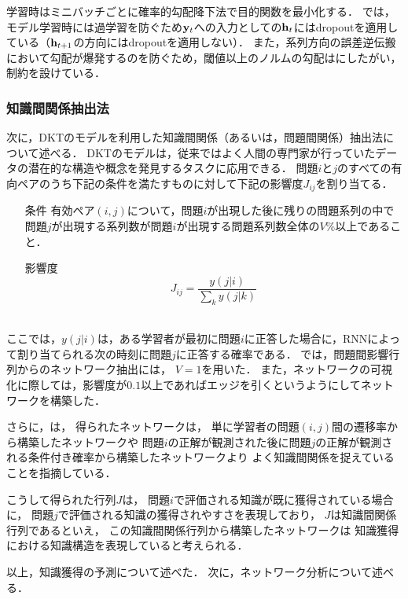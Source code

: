 学習時はミニバッチごとに確率的勾配降下法で目的関数を最小化する．
\cite{piech2015deep}では，モデル学習時には過学習を防ぐため${\bf y}_t$への入力としての${\bf h}_t$にはdropout\cite{srivastava2014dropout}を適用している（${\bf h}_{t+1}$の方向にはdropoutを適用しない）．
また，系列方向の誤差逆伝搬\cite{werbos1990backpropagation}において勾配が爆発するのを防ぐため，閾値以上のノルムの勾配は\cite{pascanu2013difficulty}にしたがい，制約を設けている．


\subsubsection{知識間関係抽出法}
次に，DKTのモデルを利用した知識間関係（あるいは，問題間関係）抽出法について述べる．
DKTのモデルは，従来ではよく人間の専門家が行っていたデータの潜在的な構造や概念を発見するタスクに応用できる．
問題$i$と$j$のすべての有向ペアのうち下記の条件を満たすものに対して下記の影響度$J_{ij}$を割り当てる．\\
\begin{itemize}
	\item [条件]有効ペア$(i, j)$について，問題$i$が出現した後に残りの問題系列の中で問題$j$が出現する系列数が問題$i$が出現する問題系列数全体の$V\%$以上であること．
	\item[影響度]
$$J_{ij} = \frac{y(j|i)}{\sum_k y(j|k)}$$\\
\end{itemize}
ここでは，$y(j|i)$は，ある学習者が最初に問題$i$に正答した場合に，RNNによって割り当てられる次の時刻に問題$j$に正答する確率である．
\cite{piech2015deep}では，問題間影響行列からのネットワーク抽出には，
$V=1$を用いた．
また，ネットワークの可視化に際しては，影響度が$0.1$以上であればエッジを引くというようにしてネットワークを構築した．

さらに，\cite{piech2015deep}は，
得られたネットワークは，
単に学習者の問題$(i, j)$間の遷移率から構築したネットワークや
問題$i$の正解が観測された後に問題$j$の正解が観測される条件付き確率から構築したネットワークより
よく知識間関係を捉えていることを指摘している．


こうして得られた行列$J$は，
問題$i$で評価される知識が既に獲得されている場合に，
問題$j$で評価される知識の獲得されやすさを表現しており，
$J$は知識間関係行列であるといえ，
この知識間関係行列から構築したネットワークは
知識獲得における知識構造を表現していると考えられる．


\vvspace
以上，知識獲得の予測について述べた．
次に，ネットワーク分析について述べる．

